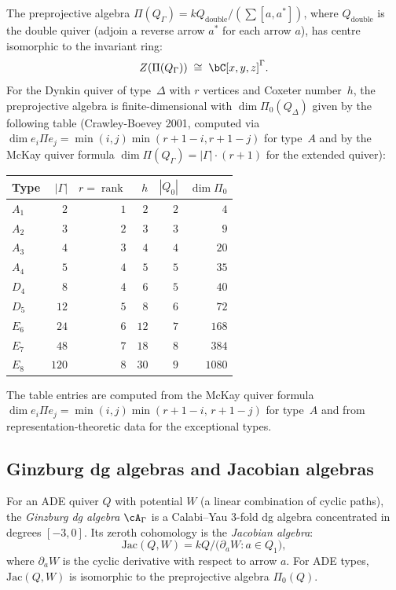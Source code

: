 \begin{proposition}
\label{prop:preprojective-mckay}
The preprojective algebra $\Pi(Q_\Gamma) = kQ_{\mathrm{double}}/
(\sum [a, a^*])$, where $Q_{\mathrm{double}}$ is the double quiver
(adjoin a reverse arrow $a^*$ for each arrow $a$), has centre
isomorphic to the invariant ring:
\[
Z(\Pi(Q_\Gamma)) \;\cong\; \bC[x,y,z]^\Gamma.
\]
For the Dynkin quiver of type~$\Delta$ with $r$ vertices and
Coxeter number~$h$, the preprojective algebra is
finite-dimensional with $\dim \Pi_0(Q_\Delta)$ given by the
following table \textup{(}Crawley-Boevey 2001, computed via
$\dim e_i\Pi e_j = \min(i,j)\min(r+1-i,r+1-j)$ for type~$A$
and by the McKay quiver formula
$\dim \Pi(Q_\Gamma) = |\Gamma| \cdot (r+1)$ for the extended
quiver\textup{)}:
\begin{center}
\small
\renewcommand{\arraystretch}{1.2}
\begin{tabular}{lrrrrr}
\textbf{Type} & $|\Gamma|$ & $r = \operatorname{rank}$
 & $h$ & $|Q_0|$ & $\dim\Pi_0$ \\
\hline
$A_1$ & $2$ & $1$ & $2$ & $2$ & $4$ \\
$A_2$ & $3$ & $2$ & $3$ & $3$ & $9$ \\
$A_3$ & $4$ & $3$ & $4$ & $4$ & $20$ \\
$A_4$ & $5$ & $4$ & $5$ & $5$ & $35$ \\
$D_4$ & $8$ & $4$ & $6$ & $5$ & $40$ \\
$D_5$ & $12$ & $5$ & $8$ & $6$ & $72$ \\
$E_6$ & $24$ & $6$ & $12$ & $7$ & $168$ \\
$E_7$ & $48$ & $7$ & $18$ & $8$ & $384$ \\
$E_8$ & $120$ & $8$ & $30$ & $9$ & $1080$
\end{tabular}
\end{center}
The table entries are computed from the McKay quiver formula
$\dim e_i\Pi e_j = \min(i,j)\min(r{+}1{-}i,\,r{+}1{-}j)$
for type~$A$ and from representation-theoretic data for the
exceptional types.
\end{proposition}

\subsection{Ginzburg dg algebras and Jacobian algebras}
\label{subsec:ginzburg-dg}

\begin{definition}
\label{def:ginzburg-dg}
For an ADE quiver $Q$ with potential $W$ (a linear combination
of cyclic paths), the \emph{Ginzburg dg algebra} $\cA_\Gamma$
is a Calabi--Yau $3$-fold dg algebra concentrated in degrees
$[-3, 0]$. Its zeroth cohomology is the \emph{Jacobian algebra}:
\[
\mathrm{Jac}(Q, W) = kQ \big/ \bigl(\partial_a W : a \in Q_1\bigr),
\]
where $\partial_a W$ is the cyclic derivative with respect to
arrow $a$. For ADE types, $\mathrm{Jac}(Q,W)$ is isomorphic
to the preprojective algebra $\Pi_0(Q)$.
\end{definition}

